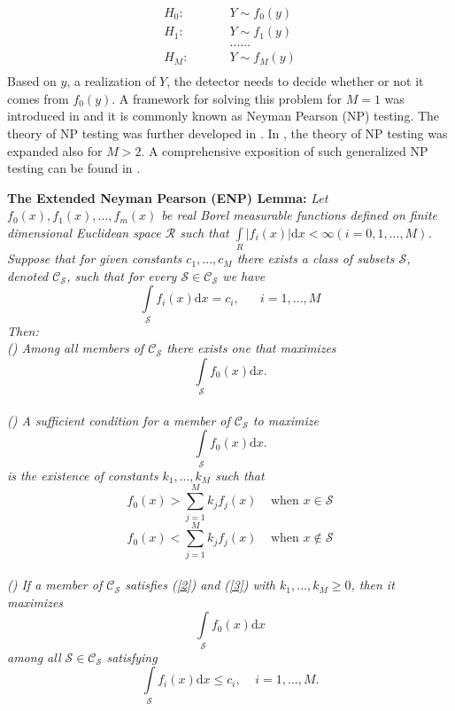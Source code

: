 \documentclass[12pt,journal,a4paper,twoside,doublecolumn]{IEEEtran}
\newcommand{\rmnum}[1]{\romannumeral #1}
\begin{document}
\begin{spacing}{1.0}
  \begin{equation}
\label{equ:hypothesis}
\begin{split}
H_0:\;\;\;\;\;\;\;\;\;&Y \sim f_0(y) \\
H_1:\;\;\;\;\;\;\;\;\;&Y \sim f_1(y)\\
&......\\
H_M:\;\;\;\;\;\;\;\;\;&Y \sim f_M(y)\\
\end{split}
\end{equation}
Based on $y$, a realization of $Y$, the detector needs to decide whether or not it comes from $f_0(y)$. A framework for solving this problem for $M=1$ was introduced in \cite{neyman1933problem} and it is commonly known as Neyman Pearson (NP) testing. The theory of NP testing was further developed in \cite{wald1939contributions}. In \cite{dantzig1951fundamental}, the theory of NP testing was  expanded also for $M>2$. A comprehensive exposition of such generalized NP testing can be found in \cite{LehmannTest}.

\noindent  \textbf{The Extended Neyman Pearson (ENP) Lemma:}
\textit{
Let $f_0(x), f_1(x), ..., f_{m}(x)$ be real Borel measurable functions  defined on finite dimensional  Euclidean space $\mathcal{R}$ such that $\int \limits_R | f_i(x)|\mathrm{d}x < \infty (i=0, 1,...,M)$.  Suppose that for given constants $c_1,...,c_M$ there exists a class of subsets $\mathcal{S}$, denoted $\mathcal{C}_\mathcal{S}$, such that for every $\mathcal{S} \in \mathcal{C}_\mathcal{S}$ we have
\begin{equation}
\label{one}
\int\limits_\mathcal{S} f_i(x)\mathrm{d}x = c_i, \;\;\;\;\;\;i=1,...,M
\end{equation}
Then:
\\\textnormal{(\rmnum{1})} Among all members of $\mathcal{C}_\mathcal{S}$ there exists one that maximizes
\[
\int \limits_\mathcal{S} f_{0}(x)\mathrm{d}x.
\]
\\\textnormal{(\rmnum{2})} A sufficient condition for a member of $\mathcal{C}_\mathcal{S}$ to maximize
\[
\int \limits_\mathcal{S} f_{0}(x)\mathrm{d}x.
\]
is the existence of constants $k_1,...,k_M$ such that
\begin{equation}
\label{2}
f_{0}(x)>\sum\limits_{j=1}^M k_j f_j(x)\;\;\;\;\text{when $x \in \mathcal{S}$}
\end{equation}
\begin{equation}
\label{3}
f_{0}(x)<\sum\limits_{j=1}^M k_j f_j(x)\;\;\;\;\text{when $x \notin \mathcal{S}$}
\end{equation}
\\\textnormal{(\rmnum{3})} If a member of $\mathcal{C}_\mathcal{S}$ satisfies  \textnormal{(\ref{2})} and \textnormal{(\ref{3})} with $k_1,...,k_M\geq0$, then it maximizes
\begin{equation}
\label{4}
\int \limits_\mathcal{S} f_{0}(x)\mathrm{d}x
\end{equation}
among all $\mathcal{S} \in \mathcal{C}_{\mathcal{S}}$ satisfying
\begin{equation}
\label{5}
\int \limits_\mathcal{S} f_i(x)\mathrm{d}x\leq c_i,\;\;\;\;i=1,...,M.
\end{equation}
}


\end{spacing}
\end{document}
